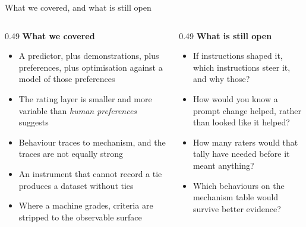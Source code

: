 \documentclass[aspectratio=169,11pt]{beamer}
\begin{document}
\begin{frame}{What we covered, and what is still open}
  \begin{columns}[t]
    \begin{column}{0.49\linewidth}
      {\bfseries What we covered}\\[0.5em]
      {\scriptsize
      \begin{itemize}\itemsep0.2em
        \item A predictor, plus demonstrations, plus preferences, plus optimisation against a
              model of those preferences
        \item The rating layer is smaller and more variable than \emph{human preferences} suggests
        \item Behaviour traces to mechanism, and the traces are not equally strong
        \item An instrument that cannot record a tie produces a dataset without ties
        \item Where a machine grades, criteria are stripped to the observable surface
      \end{itemize}}
    \end{column}
    \begin{column}{0.49\linewidth}
      {\bfseries What is still open}\\[0.5em]
      {\scriptsize
      \begin{itemize}\itemsep0.2em
        \item If instructions shaped it, which instructions steer it, and why those?
        \item How would you know a prompt change helped, rather than looked like it helped?
        \item How many raters would that tally have needed before it meant anything?
        \item Which behaviours on the mechanism table would survive better evidence?
      \end{itemize}}
    \end{column}
  \end{columns}
\end{frame}
\end{document}
